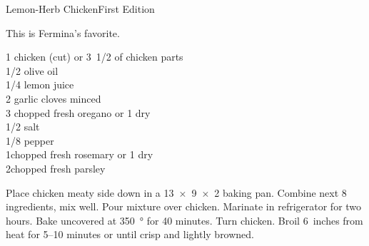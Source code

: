 \begin{entry}{Lemon-Herb Chicken}{First Edition}

\begin{open}
  This is Fermina's favorite.
\end{open}
\begin{ingredients}
  1 chicken (cut) or \SI{1/2}[3]{\pound} of chicken parts      \\
  \SI{1/2}{\cup} olive oil                                     \\
  \SI{1/4}{\cup} lemon juice                                   \\
  2 garlic cloves minced                                       \\
  \SI{3}{\tblspoon} chopped fresh oregano or \SI{1}{\tblspoon} dry \\
  \SI{1/2}{\teaspoon} salt                                     \\
  \SI{1/8}{\teaspoon} pepper                                   \\
  \SI{1}{\tblspoon}chopped fresh rosemary or \SI{1}{\teaspoon} dry \\
  \SI{2}{\tblspoon}chopped fresh parsley
\end{ingredients}
Place chicken meaty side down in a \SI{13x9x2}{\inch} baking pan.  Combine
next 8 ingredients, mix well.  Pour mixture over chicken.  Marinate in
refrigerator for two hours.  Bake uncovered at \SI{350}{\degree} for 40 minutes.
Turn chicken.  Broil 6~inches from heat for \numrange{5}{10} minutes or
until crisp and lightly browned.
\end{entry}


